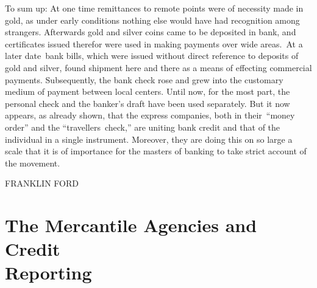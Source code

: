 \documentclass[twoside,symmetric,nobib,justified]{tufte-book}
\let\oldchapter\chapter
\def\chapter{%
  \setcounter{footnote}{0}%
  \oldchapter
}
\begin{document}
To sum up: At one time remittances to remote points were of necessity
made in gold, as under early conditions nothing else would have had
recognition among strangers. Afterwards gold and silver coins came to be
deposited in bank, and certificates issued therefor were used in making
payments over wide areas.~At a later date~bank bills, which were issued
without direct reference to deposits of gold and silver, found shipment
here and there as a means of effecting commercial payments.
Subsequently, the bank check rose and grew into the customary medium of
payment between local centers. Until now, for the most part, the
personal check and the banker's draft have been used separately. But it
now appears, as already shown, that the express companies, both in
their~``money order'' and the ``travellers~check,'' are uniting bank
credit and that of the individual in a single instrument. Moreover, they
are doing this on so large a scale that it is of importance for the
masters of banking to take strict account of the movement.~

\vspace{0.2in}

\hfill{\Large FRANKLIN FORD}

\vspace{0.1in}

\hspace{0.25in}{\large February 8, 1899}

\chapter[The Mercantile Agencies and Credit Reporting]{The Mercantile Agencies and Credit\\\noindent Reporting}
\label{ch:The Mercantile Agencies and Credit Reporting}

\vspace{.2in}

\begin{LARGE}


\end{LARGE}
\end{document}

